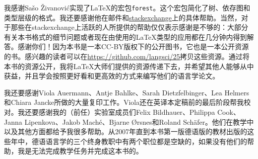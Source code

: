 我感谢Sašo Živanović实现了\LaTeX{}的宏包\texttt{forest}。这个宏包简化了树、依存图和类型层级的格式。我还要感谢他在邮件和\href{http://www.stackexchange.com}{stackexchange}上的具体帮助。当然，对于那些在stackexchange上活跃的人所提供的帮助仅仅表示感谢是不够的：大部分有关本书格式的细节问题或者现在由\lsp 使用的\LaTeX{}类型的应用都在几分钟内得到解答。感谢你们！因为本书是一本CC-BY版权下的公开图书，它也是一本公开资源的书。感兴趣的读者可以在\url{https://github.com/langsci/25}拷贝这些资源。通过将本书的资源公开，我将\LaTeX{}大师们提供的资源传递下去，并希望其他人能够从中获益，并且学会按照更好看和更高效的方式来编写他们的语言学论文。

我还要感谢Viola Auermann、Antje Bahlke、Sarah Dietzfelbinger、Lea Helmers和Chiara Jancke所做的大量复印工作。Viola还在英译本定稿前的最后阶段帮我校对。我还要感谢我的（前任）实验室成员们Felix Bildhauer、Philippa Cook、Janna Lipenkova、Jakob Maché、Bjarne Ørsnes和Roland Schäfer。他们在教学中以及其他方面都给予我很多帮助。从2007年直到本书第一版德语版的教材出版的这些年中，德语语言学的三个终身教职中有两个职位都是空缺的，如果没有他们的帮助，我是无法完成教学任务并完成这本书的。


